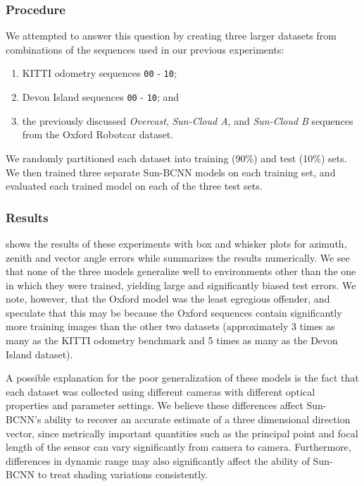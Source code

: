 \subsubsection{Procedure}
We attempted to answer this question by creating three larger datasets from combinations of the sequences used in our previous experiments:
\begin{enumerate}
	\item KITTI odometry sequences \texttt{00} - \texttt{10}; 
	\item Devon Island sequences \texttt{00} - \texttt{10}; and
	\item the previously discussed \emph{Overcast}, \emph{Sun-Cloud A}, and \emph{Sun-Cloud B} sequences from the Oxford Robotcar dataset.
\end{enumerate}
We randomly partitioned each dataset into training (90\%) and test (10\%) sets.
We then trained three separate Sun-BCNN models on each training set, and evaluated each trained model on each of the three test sets.
 
\subsubsection{Results}
 shows the results of these experiments with box and whisker plots for azimuth, zenith and vector angle errors while  summarizes the results numerically. 
We see that none of the three models generalize well to environments other than the one in which they were trained, yielding large and significantly biased test errors.
We note, however, that the Oxford model was the least egregious offender, and speculate that this may be because the Oxford sequences contain significantly more training images than the other two datasets (approximately 3 times as many as the KITTI odometry benchmark and 5 times as many as the Devon Island dataset).

A possible explanation for the poor generalization of these models is the fact that each dataset was collected using different cameras with different optical properties and parameter settings.
We believe these differences affect Sun-BCNN's ability to recover an accurate estimate of a three dimensional direction vector, since metrically important quantities such as the principal point and focal length of the sensor can vary significantly from camera to camera. 
Furthermore, differences in dynamic range may also significantly affect the ability of Sun-BCNN to treat shading variations consistently.

